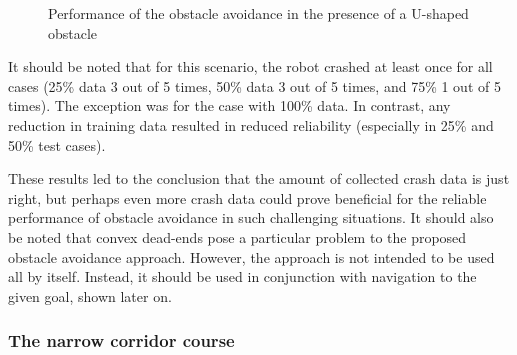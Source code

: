 \begin{figure}
    \centering
    \hfill
    \caption{Performance of the obstacle avoidance in the presence of a U-shaped obstacle}
    \label{fig:Fig09}
\end{figure}

It should be noted that for this scenario, the robot crashed at least once for all cases (25\% data 3 out of 5 times, 50\% data 3 out of 5 times, and 75\% 1 out of 5 times). The exception was for the case with 100\% data. In contrast, any reduction in training data resulted in reduced reliability (especially in 25\% and 50\% test cases).

These results led to the conclusion that the amount of collected crash data is just right, but perhaps even more crash data could prove beneficial for the reliable performance of obstacle avoidance in such challenging situations. It should also be noted that convex dead-ends pose a particular problem to the proposed obstacle avoidance approach. However, the approach is not intended to be used all by itself. Instead, it should be used in conjunction with navigation to the given goal, shown later on.

\subsubsection{The narrow corridor course}

